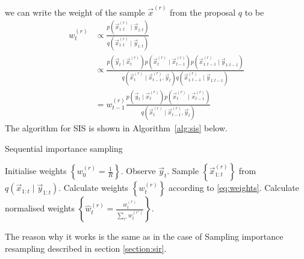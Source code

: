     we can write the weight of the sample $\vec x^{(r)}$ from the proposal $q$ to be
    \begin{align}
        w_t^{(r)}   &\propto \frac{p\left(\vec x_{1:t}^{(r)} \mid \vec y_{1:t}\right)}{q\left(\vec x_{1:t}^{(r)} \mid \vec y_{1:t}\right)} \\
                    &\propto \frac{p\left(\vec y_t \mid \vec x_t^{(r)}\right) p\left(\vec x_t^{(r)} \mid \vec x_{t - 1}^{(r)}\right) p\left(\vec x_{1:t - 1}^{(r)} \mid \vec y_{1:t - 1}\right)}{q\left(\vec x_t^{(r)} \mid \vec x_{t-1}^{(r)}, \vec y_t\right) q\left(\vec x_{1:t-1}^{(r)} \mid \vec y_{1:t - 1}\right)} \\
                    &= w_{t - 1}^{(r)} \frac{p\left(\vec y_t \mid \vec x_t^{(r)}\right) p\left(\vec x_t^{(r)} \mid \vec x_{t - 1}^{(r)}\right)}{q\left(\vec x_t^{(r)} \mid \vec x_{t - 1}^{(r)}, \vec y_t\right)} \label{eq:weights}
    \end{align}
    The algorithm for SIS is shown in Algorithm~\ref{alg:sis} below.
    \begin{algorithm}
    \caption{Sequential importance sampling}\label{alg:sis}
        \begin{algorithmic}[1]
            \State Initialise weights $\left\{w_0^{(r)} = \frac{1}{R}\right\}$.
                \State Observe $\vec y_t$.
                \State Sample $\left\{\vec x_{1:t}^{(r)}\right\}$ from $q\left(\vec x_{1:t} \mid \vec y_{1:t}\right)$.
                \State Calculate weights $\left\{w_t^{(r)}\right\}$ according to \eqref{eq:weights}.
                \State Calculate normalised weights $\left\{\hat w_t^{(r)} = \frac{w_t^{(r)}}{\sum_{r'} w_t^{(r')}}\right\}$.
                \State {}
            \EndFor
        \end{algorithmic}
    \end{algorithm}
    The reason why it works is the same as in the case of Sampling importance resampling described in section \ref{section:sir}.

